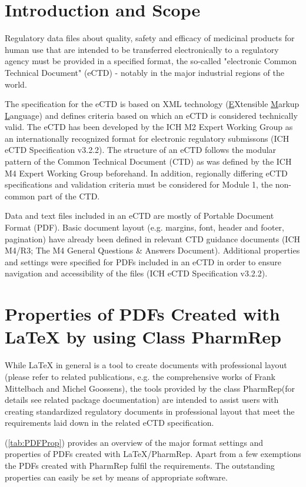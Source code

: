 \documentclass{pharmrep}
\newcommand{\PharmRep}{\textsf{PharmRep}\xspace}
\begin{document}
\section{Introduction and Scope}
Regulatory data files about quality, safety and efficacy of medicinal products for human use that are intended to be transferred electronically to a regulatory agency must be provided in a specified format, the so-called "electronic Common Technical Document" (eCTD) - notably in the major industrial regions of the world.

The specification for the eCTD is based on XML technology (\underline{E}Xtensible \underline{M}arkup \underline{L}anguage) and defines criteria based on which an eCTD is considered technically valid. The eCTD has been developed by the ICH M2 Expert Working Group  as an internationally recognized format for electronic regulatory submissons (ICH eCTD Specification v3.2.2). The structure of an eCTD follows the modular pattern of the Common Technical Document (CTD) as was defined by the ICH M4 Expert Working Group beforehand. In addition, regionally differing eCTD specifications and validation criteria must be considered for Module 1, the non-common part of the CTD.

Data and text files included in an eCTD are mostly of Portable Document Format (PDF). Basic document layout (e.g. margins, font, header and footer, pagination) have already been defined in relevant CTD guidance documents (ICH M4/R3; The M4 General Questions \& Answers Document). Additional properties and settings were specified for PDFs included in an eCTD  in order to ensure navigation and accessibility of the files (ICH eCTD Specification v3.2.2).

\section{Properties of PDFs Created with \LaTeX{} by using Class PharmRep}
While \LaTeX{} in general is a tool to create documents with professional layout (please refer to related publications, e.g. the comprehensive works of Frank Mittelbach and Michel Goossens), the tools provided by the class \PharmRep (for details see related package documentation) are intended to assist users with creating standardized regulatory documents in professional layout that meet the requirements laid down in the related eCTD specification.

(\autoref{tab:PDFProp}) provides an overview of the major format settings and properties of PDFs created with \LaTeX{}/PharmRep. Apart from a few exemptions the PDFs created with PharmRep fulfil the requirements. The outstanding properties can easily be set by means of appropriate software.
\end{document}
